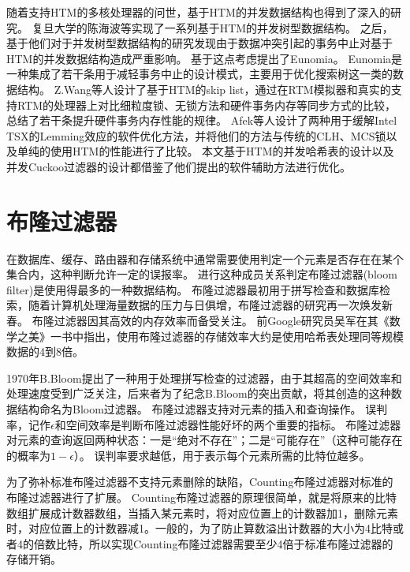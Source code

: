 随着支持HTM的多核处理器的问世，基于HTM的并发数据结构也得到了深入的研究。
复旦大学的陈海波等实现了一系列基于HTM的并发树型数据结构\cite{wang2014using,wei2015fast,chen2016fast}。
之后，基于他们对于并发树型数据结构的研究发现由于数据冲突引起的事务中止对基于HTM的并发数据结构造成严重影响。
基于这点考虑提出了Eunomia\cite{wang2017eunomia}。
Eunomia是一种集成了若干条用于减轻事务中止的设计模式，主要用于优化搜索树这一类的数据结构。
Z.Wang等人设计了基于HTM的skip list\cite{wang2013opportunities}，通过在RTM模拟器和真实的支持RTM的处理器上对比细粒度锁、无锁方法和硬件事务内存等同步方式的比较，总结了若干条提升硬件事务内存性能的规律。
Afek\cite{Afek2014Software}等人设计了两种用于缓解Intel TSX的Lemming效应的软件优化方法，并将他们的方法与传统的CLH、MCS锁以及单纯的使用HTM的性能进行了比较。
本文基于HTM的并发哈希表的设计以及并发Cuckoo过滤器的设计都借鉴了他们提出的软件辅助方法进行优化。

\section{布隆过滤器}

在数据库、缓存、路由器和存储系统中通常需要使用判定一个元素是否存在在某个集合内，这种判断允许一定的误报率。
进行这种成员关系判定布隆过滤器(bloom filter)是使用得最多的一种数据结构\cite{bloom1970space}。
布隆过滤器最初用于拼写检查和数据库检索，随着计算机处理海量数据的压力与日俱增，布隆过滤器的研究再一次焕发新春\cite{xiekun2009}。
布隆过滤器因其高效的内存效率而备受关注。
前Google研究员吴军\cite{吴军2012数学之美}在其《数学之美》一书中指出，使用布隆过滤器的存储效率大约是使用哈希表处理同等规模数据的4到8倍。

1970年B.Bloom\cite{bloom1970space}提出了一种用于处理拼写检查的过滤器，由于其超高的空间效率和处理速度受到广泛关注，后来者为了纪念B.Bloom的突出贡献，将其创造的这种数据结构命名为Bloom过滤器。
布隆过滤器支持对元素的插入和查询操作。
误判率，记作$\epsilon$和空间效率是判断布隆过滤器性能好坏的两个重要的指标。
布隆过滤器对元素的查询返回两种状态：一是“绝对不存在”；二是“可能存在”（这种可能存在的概率为$1-\epsilon$）。
误判率要求越低，用于表示每个元素所需的比特位越多。

为了弥补标准布隆过滤器不支持元素删除的缺陷，Counting布隆过滤器\cite{fan1998summary}对标准的布隆过滤器进行了扩展。
Counting布隆过滤器的原理很简单，就是将原来的比特数组扩展成计数器数组，当插入某元素时，将对应位置上的计数器加1，删除元素时，对应位置上的计数器减1。一般的，为了防止算数溢出计数器的大小为4比特或者4的倍数比特，所以实现Counting布隆过滤器需要至少4倍于标准布隆过滤器的存储开销。

